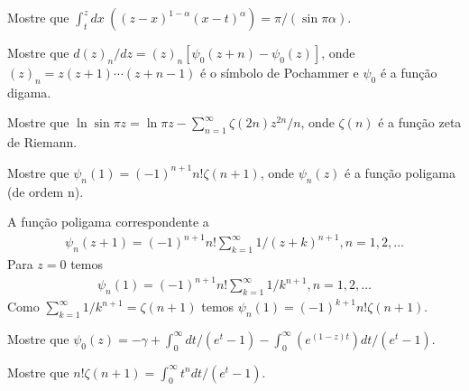 \documentclass[a4paper,12pt, leqno, answers]{exam}
\begin{document}
\begin{questions}
    \question Mostre que $\int_t^z dx \ \left( \left( z - x \right)^{1 - \alpha} \left( x - t \right)^{\alpha} \right) = \pi / \left( \sin \pi \alpha \right)$.
    \begin{solution}
        
    \end{solution}

    \question Mostre que $d \left( z \right)_n / d z = \left( z \right)_n \left[ \psi_0 \left( z + n \right) - \psi_0\left( z \right) \right]$, onde $\left( z \right)_n = z \left( z + 1 \right) \cdots \left( z + n - 1 \right)$ \'{e} o s\'{i}mbolo de Pochammer e $\psi_0$ \'{e} a fun\c{c}\~{a}o digama.
    \begin{solution}
        
    \end{solution}

    \question Mostre que $\ln \sin \pi z = \ln \pi z - \sum_{n = 1}^\infty \zeta(2n) z^{2n} / n$, onde $\zeta(n)$ \'{e} a fun\c{c}\~{a}o zeta de Riemann.
    \begin{solution}
        
    \end{solution}

    \question Mostre que $\psi_n(1) = \left( -1 \right)^{n + 1} n! \zeta(n + 1)$, onde $\psi_n(z)$ \'{e} a fun\c{c}\~{a}o poligama (de ordem n).
    \begin{solution}
        A fun\c{c}\~{a}o poligama correspondente a
        \begin{align*}
            \psi_n(z + 1) = (-1)^{n + 1} n! \sum_{k = 1}^\infty 1/(z + k)^{n + 1}, n = 1, 2, \ldots
        \end{align*}
        Para $z = 0$ temos
        \begin{align*}
            \psi_n(1) = (-1)^{n + 1}n ! \sum_{k = 1}^\infty 1/k^{n + 1}, n = 1, 2, \ldots
        \end{align*}
        Como $\sum_{k = 1}^\infty 1/k^{n + 1} = \zeta(n + 1)$ temos $\psi_n(1) = (-1)^{k + 1} n! \zeta(n + 1)$.
    \end{solution}

    \question Mostre que $\psi_0(z) = -\gamma + \int_0^\infty dt / \left( e^t - 1 \right) - \int_0^\infty \left( e^{\left( 1 - z \right) t} \right) dt / \left( e^t - 1 \right)$.
    \begin{solution}
        
    \end{solution}

    \question Mostre que $n! \zeta(n + 1) = \int_0^\infty t^n dt / \left( e^t - 1 \right)$.
    \begin{solution}
        

\end{solution}
\end{questions}
\end{document}
